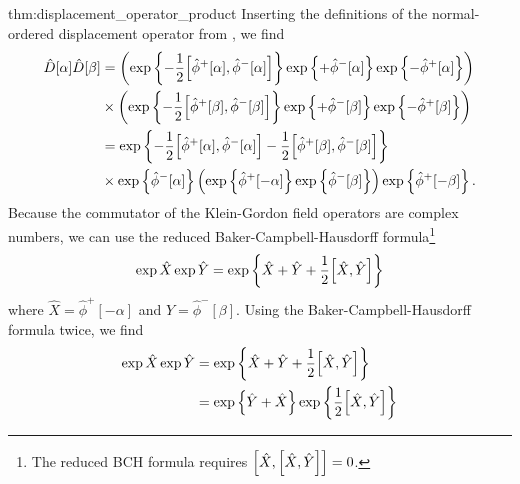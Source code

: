 \begin{delayedproof}{thm:displacement_operator_product}
	Inserting the definitions of the normal-ordered displacement operator from , we find
	\begin{equation*}
		\begin{split}
			\hat{D}[\alpha]
			\hat{D}[\beta]
			&=
			\left(
				\exp\left\{
					-
					\frac{1}{2}
					\comm{\hat\phi^+[\alpha]}{\hat\phi^-[\alpha]}
				\right\}
				\exp\left\{
					+\hat\phi^-[\alpha]
				\right\}
				\exp\left\{
					-\hat\phi^+[\alpha]
				\right\}
			\right)
			\\
			&\times
			\left(
				\exp\left\{
					-
					\frac{1}{2}
					\comm{\hat\phi^+[\beta]}{\hat\phi^-[\beta]}
				\right\}
				\exp\left\{
					+\hat\phi^-[\beta]
				\right\}
				\exp\left\{
					-\hat\phi^+[\beta]
				\right\}
			\right)
			\\
			&=
			\exp\left\{
				-
				\frac{1}{2}
				\comm{\hat\phi^+[\alpha]}{\hat\phi^-[\alpha]}
				-
				\frac{1}{2}
				\comm{\hat\phi^+[\beta]}{\hat\phi^-[\beta]}
			\right\}
			\\
			&\times
			\exp\left\{
				\hat\phi^-[\alpha]
			\right\}
			\left(
				\exp\left\{
					\hat\phi^+[-\alpha]
				\right\}
				\exp\left\{
					\hat\phi^-[\beta]
				\right\}
			\right)
			\exp\left\{
				\hat\phi^+[-\beta]
			\right\}
			.
		\end{split}
	\end{equation*}
	Because the commutator of the Klein-Gordon field operators are complex numbers, we can use the reduced Baker-Campbell-Hausdorff formula\footnote{The reduced BCH formula requires $\comm{\hat{X}}{\comm{\hat{X}}{\hat{Y}}}=0$.}
	\begin{equation*}
		\exp\hat{X}
		\exp\hat{Y}
		=
		\exp\left\{
			\hat{X}
			+
			\hat{Y}
			+
			\frac{1}{2}
			\comm{\hat{X}}{\hat{Y}}
		\right\}
	\end{equation*}
	where $\hat{X}=\hat\phi^+[-\alpha]$ and $\hat{Y}=\hat\phi^-[\beta]$.
	Using the Baker-Campbell-Hausdorff formula twice, we find
	\begin{equation*}
		\begin{split}
			\exp\hat{X}
			\exp\hat{Y}
			&=
			\exp\left\{
				\hat{X}
				+
				\hat{Y}
				+
				\frac{1}{2}
				\comm{\hat{X}}{\hat{Y}}
			\right\}
			\\
			&=
			\exp\left\{
				\hat{Y}
				+
				\hat{X}
			\right\}
			\exp\left\{
				\frac{1}{2}
				\comm{\hat{X}}{\hat{Y}}
			\right\}
			\\

\end{split}
\end{equation*}
\end{delayedproof}
